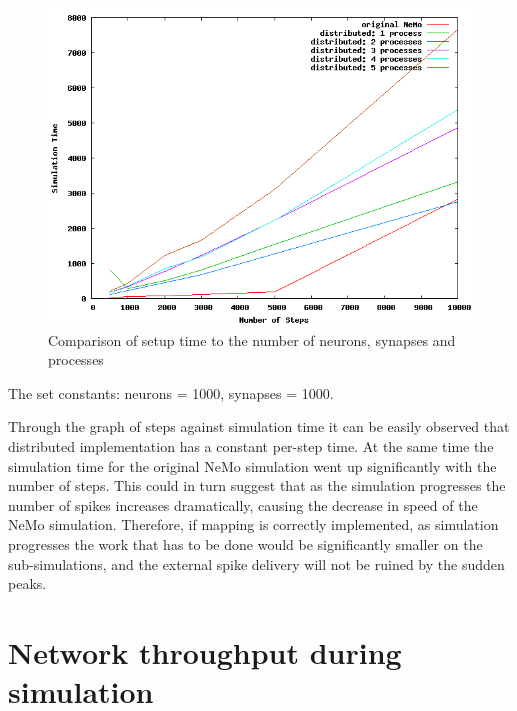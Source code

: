 \begin{figure}[h!]
\begin{center}
\includegraphics[scale = 0.4]{images/distributed_steps.png}
\end{center}
\caption{Comparison of setup time to the number of neurons, synapses and processes}
\end{figure}

The set constants: neurons = 1000, synapses = 1000.

Through the graph of steps against simulation time it can be easily observed that distributed implementation has a constant per-step time. At the same time the simulation time for the original NeMo simulation went up significantly with the number of steps. This could in turn suggest that as the simulation progresses the number of spikes increases dramatically, causing the decrease in speed of the NeMo simulation. Therefore, if mapping is correctly implemented, as simulation progresses the work that has to be done would be significantly smaller on the sub-simulations, and the external spike delivery will not be ruined by the sudden peaks.

\clearpage

\section{Network throughput during simulation}

